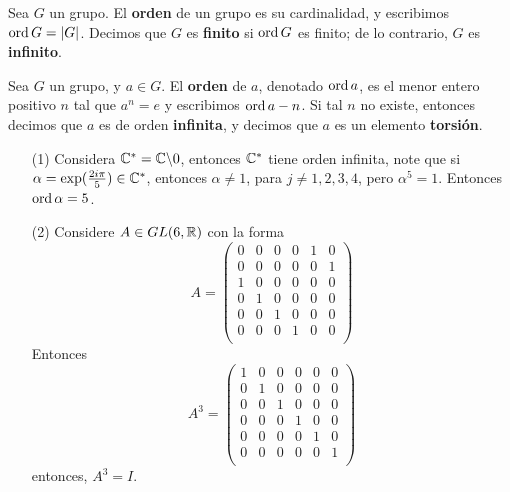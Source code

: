\begin{definition}
    Sea $G$ un grupo. El \textbf{orden} de un grupo es su cardinalidad, y
    escribimos $\operatorname{ord}{G}=|G|$. Decimos que $G$ es  \textbf{finito} si $\operatorname{ord}{G}$
    es finito; de lo contrario, $G$ es  \textbf{infinito}.
\end{definition}

\begin{definition}
    Sea $G$ un grupo, y  $a \in G$. El  \textbf{orden} de $a$, denotado
    $\operatorname{ord}{a}$, es el menor entero positivo $n$ tal que  $a^n=e$ y escribimos
    $\operatorname{ord}{a}-n$. Si tal $n$ no existe, entonces decimos que $a$ es de orden
    \textbf{infinita}, y decimos que $a$ es un elemento  \textbf{torsi\'on}.
\end{definition}

\begin{example}\label{example_2}
    \begin{enumerate}
        \item[(1)] Considera $\mathbb{C}^*=\mathbb{C}\backslash0$, entonces $\mathbb{C}^*$ tiene orden
            infinita, note que si $\alpha=\exp(\frac{2i\pi}{5}) \in \mathbb{C}^*$,
            entonces $\alpha \neq 1$, para $j \neq 1,2,3,4$, pero $\alpha^5=1$.
            Entonces $\operatorname{ord}{\alpha}=5$.

         \item[(2)] Considere $A \in GL(6,\mathbb{R})$ con la forma
             \begin{equation*}
               A=\begin{pmatrix}
                     0 & 0 & 0 & 0 & 1 & 0 \\
                     0 & 0 & 0 & 0 & 0 & 1 \\
                     1 & 0 & 0 & 0 & 0 & 0 \\
                     0 & 1 & 0 & 0 & 0 & 0 \\
                     0 & 0 & 1 & 0 & 0 & 0 \\
                     0 & 0 & 0 & 1 & 0 & 0 \\
                 \end{pmatrix}
             \end{equation*}
            Entonces
             \begin{equation*}
               A^3=\begin{pmatrix}
                     1 & 0 & 0 & 0 & 0 & 0 \\
                     0 & 1 & 0 & 0 & 0 & 0 \\
                     0 & 0 & 1 & 0 & 0 & 0 \\
                     0 & 0 & 0 & 1 & 0 & 0 \\
                     0 & 0 & 0 & 0 & 1 & 0 \\
                     0 & 0 & 0 & 0 & 0 & 1 \\
                 \end{pmatrix}
             \end{equation*}
             entonces, $A^3=I$.


\end{enumerate}
\end{example}
